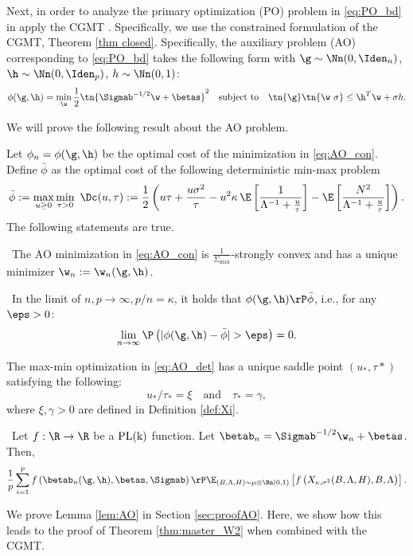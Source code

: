 Next, in order to analyze the primary optimization (PO) problem in \eqref{eq:PO_bd} in apply the CGMT \cite{thrampoulidis2015lasso}. Specifically, we use the constrained formulation of the CGMT, Theorem \ref{thm closed}.  Specifically, the auxiliary problem (AO) corresponding to \eqref{eq:PO_bd} takes the following form with $\g\sim\Nn(0,\Iden_n)$, $\h\sim\Nn(0,\Iden_p)$, $h\sim \Nn(0,1)$:%
\begin{align}
\phi(\g,\h) = \min_{\w} \frac{1}{2}\tn{\Sigmab^{-1/2}\w+\betas}^2\quad\text{subject to}\quad \tn{\g}\tn{\w~{\sigma}}\leq \h^T\w+\sigma h.\label{eq:AO_con}
\end{align}%

We will prove the following result about the AO problem.
\begin{lemma}\label{lem:AO}
Let $\phi_n=\phi(\g,\h)$ be the optimal cost of the minimization in \eqref{eq:AO_con}. Define $\bar\phi$ as the optimal cost of the following deterministic min-max problem
\begin{align}\label{eq:AO_det}
\bar\phi:=\max_{u\geq 0}\min_{\tau>0}~ \Dc(u,\tau):=\frac{1}{2}\left({u\tau} + \frac{u\sigma^2}{\tau} - u^2\kappa\,\E\left[ \frac{1}{\Lambda^{-1}+\frac{u}{\tau}} \right] - \E\left[\frac{N^2}{\Lambda^{-1}+\frac{u}{\tau}}\right] \right).
\end{align}
The following statements are true.

~The AO minimization in \eqref{eq:AO_con} is $\frac{1}{\Sigma_{\max}}$-strongly convex and has a unique minimizer $\w_n:=\w_n(\g,\h)$.

~In the limit of $n,p\rightarrow\infty, p/n=\kappa$, it holds that $\phi(\g,\h)\rP\bar\phi$, i.e., for any $\eps>0$:
$$
\lim_{n\rightarrow\infty}\P\left(|\phi(\g,\h)-\bar\phi|>\eps\right) = 0.
$$

 The max-min optimization in \eqref{eq:AO_det} has a unique saddle point $(u_*,\tau*)$ satisfying the following: 
$$
u_*/\tau_* = \xi\quad\text{and}\quad\tau_* = \gamma,
$$
where $\xi, \gamma>0$ are defined in Definition \ref{def:Xi}.

~Let $f:\R\rightarrow\R$ be a $\rm{PL}({k})$ function. Let $\betab_n=\Sigmab^{-1/2}\w_n + \betas$. Then,
$$
\frac{1}{p}\sum_{i=1}^{p}f\left(\betab_n(\g,\h),\betas,\Sigmab\right) \rP \E_{(B,\Lambda,H)\sim\mu\otimes	\Nn(0,1)}\left[f\left(X_{\kappa,\sigma^2}(B,\Lambda,H),B,\Lambda\right) \right].
$$

\end{lemma}
We prove Lemma \ref{lem:AO} in Section \ref{sec:proofAO}. Here, we show how this leads to the proof of Theorem \ref{thm:master_W2} when combined with the CGMT.



